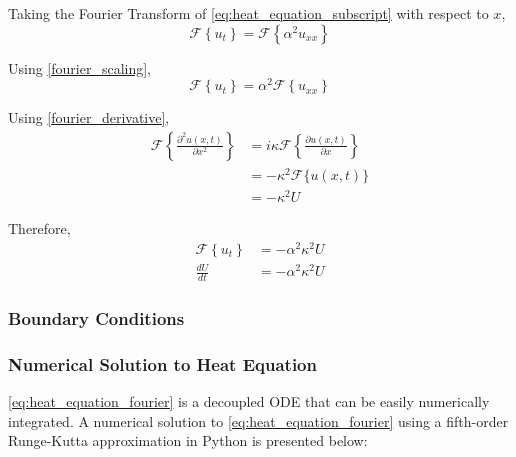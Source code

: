 \vspace{5mm}
\noindent
Taking the Fourier Transform of \cref{eq:heat_equation_subscript} with respect to \(x\),
\begin{equation}
    \mathcal{F} \left\{ u_t \right\} = \mathcal{F} \left\{ \alpha^2 u_{xx} \right\}
\end{equation}

\noindent
Using \cref{fourier_scaling},
\begin{equation}
    \mathcal{F} \left\{ u_t \right\} = \alpha^2 \mathcal{F} \left\{ u_{xx} \right\}
\end{equation}

\noindent
Using \cref{fourier_derivative},
\begin{align}
    \mathcal{F} \left\{ \frac{\partial^2 u(x, t)}{\partial x^2} \right\} & = i \kappa \mathcal{F} \left\{ \frac{\partial u(x, t)}{\partial x} \right\} \\
    & = -\kappa^2 \mathcal{F}\{ u(x, t) \} \\
    & = -\kappa^2 U
\end{align}

\noindent
Therefore,
\begin{align}
    \mathcal{F} \left\{ u_t \right\} &= -\alpha^2 \kappa^2 U \\
    \frac{dU}{dt} &= -\alpha^2 \kappa^2 U \label{eq:heat_equation_fourier}
\end{align}

\subsubsection{Boundary Conditions} %

\subsubsection{Numerical Solution to Heat Equation} %
\cref{eq:heat_equation_fourier} is a decoupled ODE that can be easily numerically integrated. A numerical solution to \cref{eq:heat_equation_fourier} using a fifth-order Runge-Kutta approximation in Python is presented below:

